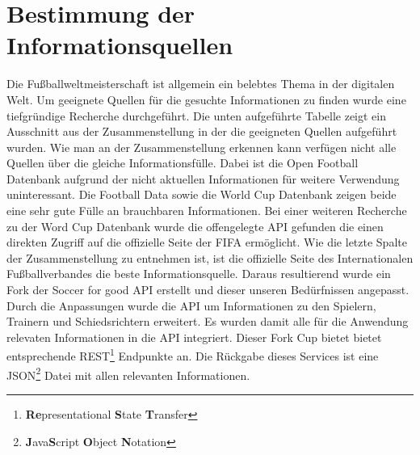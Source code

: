 \documentclass[runningheads,a4paper]{llncs}
\begin{document}
\newpage
\section{Bestimmung der Informationsquellen}\label{infoQuell}

Die Fußballweltmeisterschaft ist allgemein ein belebtes Thema in der digitalen Welt. Um geeignete Quellen für die gesuchte Informationen zu finden wurde eine tiefgründige Recherche durchgeführt. Die unten aufgeführte Tabelle zeigt ein Ausschnitt aus der Zusammenstellung in der die geeigneten Quellen aufgeführt wurden. Wie man an der Zusammenstellung erkennen kann verfügen nicht alle Quellen über die gleiche Informationsfülle. Dabei ist die Open Football \cite{url_openfootball} Datenbank aufgrund der nicht aktuellen Informationen für weitere Verwendung uninteressant. Die Football Data \cite{url_footballdata} sowie die World Cup \cite{url_worldcup} Datenbank zeigen beide eine sehr gute Fülle an brauchbaren Informationen. Bei einer weiteren Recherche zu der Word Cup Datenbank wurde die offengelegte API gefunden die einen direkten Zugriff auf die offizielle Seite der FIFA ermöglicht. Wie die letzte Spalte der Zusammenstellung zu entnehmen ist, ist die offizielle Seite des Internationalen Fußballverbandes die beste Informationsquelle. 
Daraus resultierend wurde ein Fork der Soccer for good API erstellt und dieser unseren Bedürfnissen angepasst. Durch die Anpassungen wurde die API um Informationen zu den Spielern, Trainern und Schiedsrichtern erweitert. Es wurden damit alle für die Anwendung relevaten Informationen in die API integriert. Dieser Fork Cup bietet bietet entsprechende REST\footnote{\textbf{Re}presentational \textbf{S}tate \textbf{T}ransfer} Endpunkte an. Die Rückgabe dieses Services ist eine JSON\footnote{\textbf{J}ava\textbf{S}cript \textbf{O}bject \textbf{N}otation} Datei mit allen relevanten Informationen. 
\end{document}

